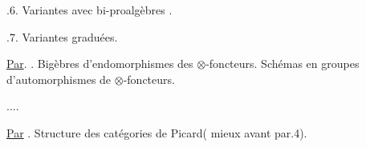
.6. Variantes avec bi-proalgèbres .

.7. Variantes graduées.

\uline{Par}. . Bigèbres d'endomorphismes des $\otimes$-foncteurs. Schémas en groupes d'automorphismes de $\otimes$-foncteurs.

....

\uline{Par} . Structure des catégories de Picard( mieux avant par.4).



